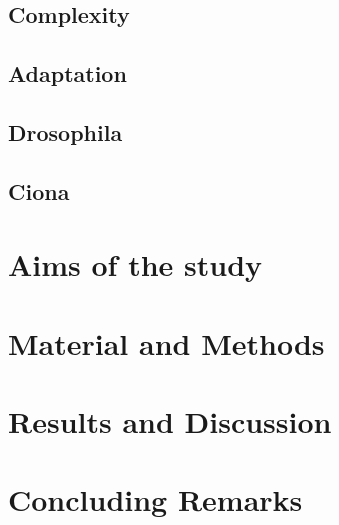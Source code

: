 \documentclass[officiallayout]{tktla_modified}
\begin{document}
\section{Complexity}
	
	\clearpage 
\section{Adaptation}
	
	\clearpage
\section{Drosophila}
	
	\clearpage
\section{Ciona}
	
	\clearpage

\chapter{Aims of the study}



\chapter{Material and Methods}



\chapter{Results and Discussion}




\chapter{Concluding Remarks}




%
{\footnotesize

}
\end{document}
